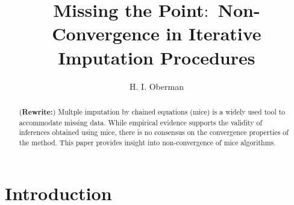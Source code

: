 \documentclass[Royal,times,sageh]{sagej}
\begin{document}
\title{Missing the Point\(\colon\) Non-Convergence in Iterative Imputation
Procedures}


\author{H. I. Oberman}




\begin{abstract}
(\textbf{Rewrite:}) Multple imputation by chained equations (mice) is a
widely used tool to accommodate missing data. While empirical evidence
supports the validity of inferences obtained using mice, there is no
consensus on the convergence properties of the method. This paper
provides insight into non-convergence of mice algorithms.
\end{abstract}


\maketitle

\hypertarget{introduction}{%
\section{Introduction}\label{introduction}}
\end{document}
